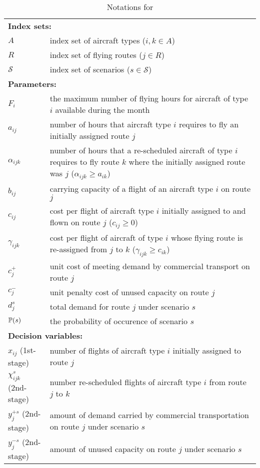 \begin{table}[H]
	\caption{Notations for \airlift}
	\label{airlift:notation}
	\resizebox{\textwidth}{!}
	{
		\begin{tabular}{ll}
			\toprule
			\multicolumn{2}{l}{\textbf{Index sets:}} \\
			$A$ & index set of aircraft types ($i,k\in A$)\\ 
			$R$ & index set of flying routes ($j\in R$)\\ 
			$\mathcal{S}$ & index set of scenarios ($s\in \mathcal{S}$) \\ \midrule
			\multicolumn{2}{l}{\textbf{Parameters:}} \\
			$F_i$ & the maximum number of flying hours for aircraft of type $i$ available during the month\\
			$a_{ij}$ & number of hours that aircraft type $i$ requires to fly an initially assigned route $j$  \\
			$\alpha_{ijk}$ & number of hours that a re-scheduled aircraft of type $i$ requires to fly route $k$ where the initially assigned route was $j$ ($\alpha_{ijk}\ge a_{ik}$)\\
			$b_{ij}$ & carrying capacity of a flight of an aircraft type $i$ on route $j$\\
			$c_{ij}$ & cost per flight of aircraft type $i$ initially assigned to and flown on route $j$ ($c_{ij}\ge 0$)\\
			$\gamma_{ijk} $& cost per flight of aircraft of type $i$ whose flying route is re-assigned from $j$ to $k$ ($\gamma_{ijk}\ge c_{ik}$)\\			
			$c_j^+$ & unit cost of meeting demand by commercial transport on route $j$\\
			$c_j^-$ & unit penalty cost of unused capacity on route $j$\\
			$d_j^s$ & total demand for route $j$ under scenario $s$ \\
			$\operatorname*{\mathbb{P}}(s)$ & \textrm{the probability of occurence of scenario $s$} \\ \midrule
			\multicolumn{2}{l}{\textbf{Decision variables:}} \\
			$x_{ij}$ (1st-stage) & number of flights of aircraft type $i$ initially assigned to route $j$ \\
			$\chi_{ijk}^s$ (2nd-stage) & number re-scheduled flights of aircraft type $i$ from route $j$ to $k$ \\ 
			$y_j^{+s}$ (2nd-stage) & amount of demand carried by commercial transportation on route $j$ under scenario $s$\\
			$y_j^{-s}$ (2nd-stage) & amount of unused capacity on route $j$ under scenario $s$\\
			\bottomrule
		\end{tabular}
	}
\end{table} 

